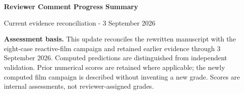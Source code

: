 \documentclass[10pt,landscape,letterpaper]{article}
\begin{document}
\color{black}
\begin{flushleft}
{\color{navy}\fontsize{23}{25}\selectfont\bfseries Reviewer Comment Progress Summary\par}
{\large Current evidence reconciliation - 3 September 2026\par}
\end{flushleft}

\vspace{5pt}
\noindent\colorbox{pale}{\parbox{\dimexpr\linewidth-2\fboxsep\relax}{\textbf{Assessment basis.} This update reconciles the rewritten manuscript with the eight-case reactive-film campaign and retained earlier evidence through 3 September 2026. Computed predictions are distinguished from independent validation. Prior numerical scores are retained where applicable; the newly computed film campaign is described without inventing a new grade. Scores are internal assessments, not reviewer-assigned grades.}}
\end{document}
